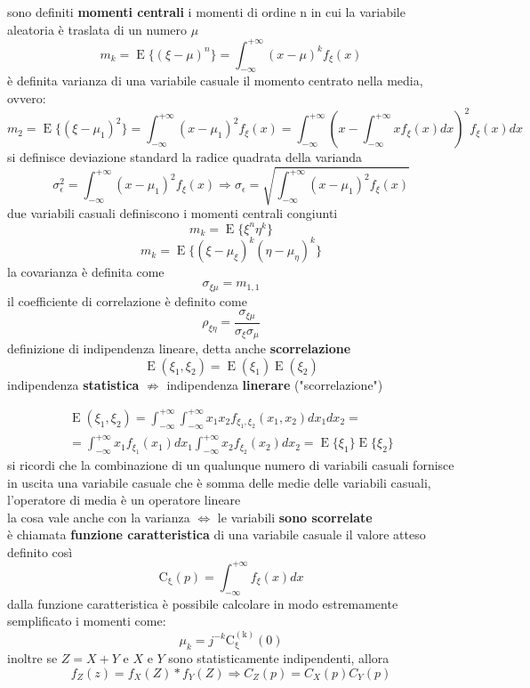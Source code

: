 \documentclass{article}
\begin{document}
sono definiti \textbf{momenti centrali} i momenti di ordine n in cui la
variabile aleatoria è traslata di un numero $\mu$
$$m_k = \operatorname{E}\{(\xi-\mu)^n\} = \int_{-\infty}^{+\infty} (x-\mu)^kf_\xi (x)$$
è definita varianza di una variabile casuale il momento centrato
nella media, ovvero:
$$m_2 = \operatorname{E}\{(\xi-\mu_1)^2\} = \int_{-\infty}^{+\infty} (x-\mu_1)^2f_\xi (x) =
\int_{-\infty}^{+\infty} (x-\int_{-\infty}^{+\infty} xf_\xi (x)dx)^2f_\xi (x)dx$$
si definisce deviazione standard la radice quadrata della varianda
$$\sigma _\epsilon^2 = \int_{-\infty}^{+\infty} (x-\mu_1)^2f_\xi (x) \Rightarrow  \sigma _\epsilon = \sqrt{\int_{-\infty}^{+\infty} (x-\mu_1)^2f_\xi (x)} $$
due variabili casuali definiscono i momenti centrali congiunti
$$m_k = \operatorname{E}\{\xi^n\eta^k\}$$
$$m_k = \operatorname{E}\{(\xi-\mu_\xi)^k(\eta-\mu_\eta )^k\}$$
la covarianza è definita come
$$\sigma _{\xi \mu} = m _{1,1}$$
il coefficiente di correlazione è definito come
$$\rho _{\xi \eta} = \frac{\sigma _{\xi \mu}}{\sigma _{\xi} \sigma _{\mu}}$$
definizione di indipendenza lineare, detta anche \textbf{scorrelazione}
$$\operatorname{E}(\xi_1,\xi_2) = \operatorname{E}(\xi_1) \operatorname{E}(\xi_2)$$
indipendenza \textbf{statistica} $\not \Rightarrow$ indipendenza \textbf{linerare} ("scorrelazione")

\begin{equation}
\begin{split}
\operatorname{E}(\xi_1,\xi_2) =
\int_{-\infty}^{+\infty} \int_{-\infty}^{+\infty} x_1x_2f_{\xi_1,\xi_2}(x_1,x_2)dx_1dx_2 =
\\
= \int_{-\infty}^{+\infty}
x_1f_{\xi_1}(x_1)dx_1\int_{-\infty}^{+\infty}x_2f_{\xi_2}(x_2)dx_2=
\operatorname{E}\{\xi_1\}\operatorname{E}\{\xi_2\}
\end{split}
\end{equation}
si ricordi che la combinazione di un qualunque numero di variabili casuali fornisce in uscita
una variabile casuale che è somma delle medie delle variabili casuali, l'operatore di media è un
operatore lineare
\\
la cosa vale anche con la varianza $\Leftrightarrow$ le variabili \textbf{sono scorrelate}
\\
è chiamata \textbf{funzione caratteristica} di una variabile casuale il valore atteso
definito così
$$\operatorname{C_\xi}(p) = \int_{-\infty}^{+\infty} f_\xi(x)dx$$
dalla funzione caratteristica è possibile calcolare in modo estremamente semplificato
i momenti come:
$$\mu_k = j^{-k}\operatorname{C_\xi^{(k)}}(0)$$
inoltre se $Z = X + Y$ e $X$ e $Y$ sono statisticamente indipendenti, allora
$$f_Z(z) = f_X(Z)*f_Y(Z) \Rightarrow C_Z(p) = C_X(p)C_Y(p)$$
\end{document}
